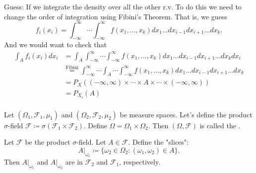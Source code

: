 \documentclass[class=article,crop=false]{standalone}
\begin{document}
Guess: If we integrate the density over all the other r.v. To do this we need to change the order of integration using Fibini's Theorem. That is, we guess
\[
	f_i(x_i) = \int_{-\infty}^{\infty} \cdots \int_{-\infty}^{\infty} f(x_1,\ldots,x_k) dx_1 \ldots d x_{i-1} d x_{i+1} \ldots d x_k  
.\] 
And we would want to check that
\begin{align*}
	\int_{A} f_i (x_i) dx_i &= \int_{A}  \int_{-\infty}^{\infty} \cdots \int_{-\infty}^{\infty} f(x_1,\ldots,x_k) dx_1 \ldots d x_{i-1} d x_{i+1} \ldots d x_k d x_i  \\
				&\overset{\mathrm{Fibini}}{=}  \int_{-\infty}^{\infty} \cdots \int_{A} \cdots \int_{-\infty}^{\infty} f(x_1,\ldots,x_k) dx_1 \ldots d x_{i-1} d x_{i+1} \ldots d x_k \\
				&= P_{X} ( (- \infty, \infty) \times \cdots \times A \times \cdots \times (-\infty,\infty)) \\
				&= P_{X_i} (A) \\
\end{align*}

\begin{defn}
Let $ (\Omega_1, \mathcal{F}_1, \mu_1)$ and $ (\Omega_2,\mathcal{F}_2, \mu_2)$ be measure spaces. Let's define the product  $\sigma$-field $ \mathcal{F} \coloneqq \sigma(\mathcal{F}_1 \times \mathcal{F}_2)$. Define $ \Omega = \Omega_1 \times \Omega_2$. Then $ (\Omega,\mathcal{F})$ is called the . 
\end{defn}

\begin{prop}[]
Let $ \mathcal{F}$ be the product $\sigma$-field. Let $ A \in \mathcal{F}$. Define the "slices":
\[
	A \big|_{\omega_1} \coloneqq \{\omega_2 \in \Omega_2: (\omega_1, \omega_2) \in A\} 
.\]
Then $ A\big|_{\omega_1}$ and $ A\big|_{\omega_2}$ are in $ \mathcal{F}_2$ and $ \mathcal{F}_1$, respectively. 
\end{prop}
\end{document}
